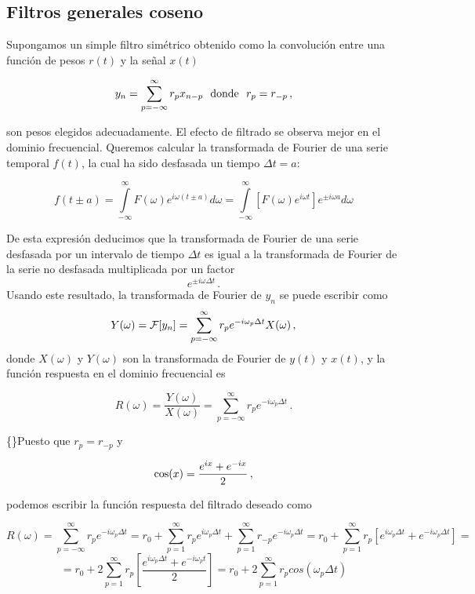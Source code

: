 \documentclass[
]{agujournal2019}
\begin{document}
\hypertarget{filtros-generales-coseno}{%
\subsection{Filtros generales coseno}\label{filtros-generales-coseno}}

Supongamos un simple filtro simétrico obtenido como la convolución entre
una función de pesos \(r(t)\) y la señal \(x(t)\)

\[y_n=\sum\limits^{\infty}_{p=-\infty} r_p x_{n-p}\,\,\,\,{\rm donde}\,\,\,\,r_p=r_{-p}\,,\]

son pesos elegidos adecuadamente. El efecto de filtrado se observa mejor
en el dominio frecuencial. Queremos calcular la transformada de Fourier
de una serie temporal \(f(t)\), la cual ha sido desfasada un tiempo
\(\Delta t = a\):

\[f(t\pm a)=\int\limits^{\infty}_{-\infty} F(\omega)e^{i\omega (t\pm a)} d{\omega}=
\int\limits^{\infty}_{-\infty}  \left[F(\omega) e^{i \omega t}\right]e^{\pm i \omega a} d{\omega}\]

De esta expresión deducimos que la transformada de Fourier de una serie
desfasada por un intervalo de tiempo \(\Delta t\) es igual a la
transformada de Fourier de la serie no desfasada multiplicada por un
factor \[e^{\pm i\omega \Delta t}\,.\] Usando este resultado, la
transformada de Fourier de \(y_n\) se puede escribir como
\[Y(\omega)={\cal F}[y_n]=\sum\limits^{\infty}_{p=-\infty} r_p e^{-i\omega_p \Delta t} X(\omega)\,,\]
donde \(X(\omega)\) y \(Y(\omega)\) son la transformada de Fourier de
\(y(t)\) y \(x(t)\), y la función respuesta en el dominio frecuencial es

\[R(\omega)=\frac{Y(\omega)}{X(\omega)}=\sum\limits^{\infty}_{p=-\infty} r_p e^{-i\omega_p \Delta t}\,.\]

\{\noindent\}Puesto que \(r_p=r_{-p}\) y

\[{\rm cos}(x)=\frac{e^{ix} + e^{-ix}}{2}\,,\]

podemos escribir la función respuesta del filtrado deseado como

\[R(\omega)=\sum\limits^{\infty}_{p=-\infty} r_p e^{-i\omega_p \Delta t}=
r_0 + \sum\limits^{\infty}_{p=1} r_p e^{i\omega_p \Delta t}
+ \sum\limits^{\infty}_{p=1} r_{-p} e^{-i\omega_p \Delta t} =
r_0 + \sum\limits^{\infty}_{p=1} r_p \left[ e^{i\omega_p \Delta t} + e^{-i\omega_p \Delta t}\right]=
\]
\[=r_0 + 2\sum\limits^{\infty}_{p=1} r_p \left[ \frac{e^{i\omega_p \Delta t} + e^{-i\omega_p t}}{2}\right]=
r_0 + 2\sum\limits^{\infty}_{p=1}r_p cos(\omega_p \Delta t)\]
\end{document}
